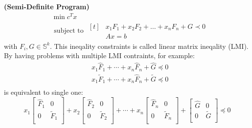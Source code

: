 \begin{definition}{\textbf{(Semi-Definite Program)}}
    \begin{equation*}
    \begin{aligned}
        &\min c^Tx \\
        &\text{ subject to } \begin{aligned}[t]
            &x_1F_1+x_2F_2+\dots+x_nF_n+G\prec0\\
            &Ax=b
        \end{aligned}
    \end{aligned}
    \end{equation*}
    with $F_i, G\in\mathbb{S}^k$. This ineqality constraints is called linear matrix ineqality (LMI). By having problems with multiple LMI contraints, for example:
    \begin{equation*}
    \begin{aligned}
        &x_1\hat{F}_1 + \cdots + x_n\hat{F}_n + \hat{G}\preceq0 \\
        &x_1\tilde{F}_1 + \cdots + x_n\hat{F}_n + \tilde{G}\preceq0 \\
    \end{aligned}
    \end{equation*}
    is equivalent to single one:
    \begin{equation*}
        x_1\begin{bmatrix}
            \hat{F}_1 & 0 \\
            0 & \tilde{F}_1 \\
        \end{bmatrix}
        +x_2\begin{bmatrix}
            \hat{F}_2 & 0 \\
            0 & \tilde{F}_2 \\
        \end{bmatrix} + \cdots + 
        x_n\begin{bmatrix}
            \hat{F}_n & 0 \\
            0 & \tilde{F}_n \\
        \end{bmatrix} + 
        \begin{bmatrix}
            \hat{G}& 0 \\
            0 & \tilde{G} \\
        \end{bmatrix}
        \preceq 0
    \end{equation*}
\end{definition}

